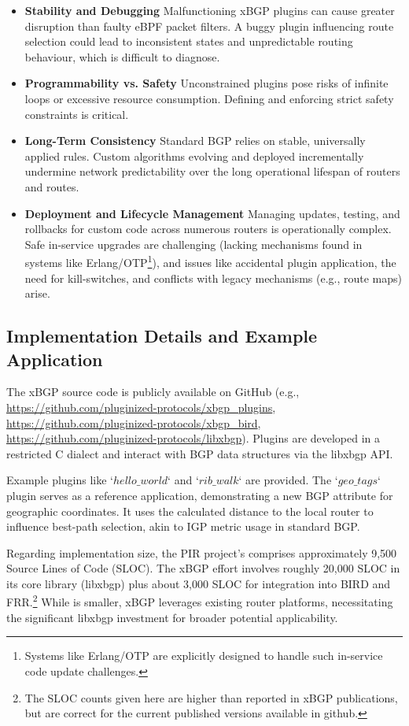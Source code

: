 \begin{itemize}
    \item \textbf{Stability and Debugging} Malfunctioning xBGP plugins can cause greater disruption than faulty eBPF packet filters. A buggy plugin influencing route selection could lead to inconsistent states and unpredictable routing behaviour, which is difficult to diagnose.
    \item \textbf{Programmability vs. Safety} Unconstrained plugins pose risks of infinite loops or excessive resource consumption. Defining and enforcing strict safety constraints is critical.
    \item \textbf{Long-Term Consistency} Standard BGP relies on stable, universally applied rules. Custom algorithms evolving and deployed incrementally undermine network predictability over the long operational lifespan of routers and routes.
    \item \textbf{Deployment and Lifecycle Management} Managing updates, testing, and rollbacks for custom code across numerous routers is operationally complex. Safe in-service upgrades are challenging (lacking mechanisms found in systems like Erlang/OTP\footnote{Systems like Erlang/OTP are explicitly designed to handle such in-service code update challenges.}), and issues like accidental plugin application, the need for kill-switches, and conflicts with legacy mechanisms (e.g., route maps) arise.
\end{itemize}

\subsection{Implementation Details and Example Application}

The xBGP source code is publicly available on GitHub (e.g., \url{https://github.com/pluginized-protocols/xbgp_plugins}, \url{https://github.com/pluginized-protocols/xbgp_bird}, \url{https://github.com/pluginized-protocols/libxbgp}). Plugins are developed in a restricted C dialect and interact with BGP data structures via the libxbgp API.

Example plugins like `$hello\_world$` and `$rib\_walk$` are provided. The `$geo\_tags$` plugin serves as a reference application, demonstrating a new BGP attribute for geographic coordinates. It uses the calculated distance to the local router to influence best-path selection, akin to IGP metric usage in standard BGP.

Regarding implementation size, the PIR project's \hbgp comprises approximately 9,500 Source Lines of Code (SLOC). The xBGP effort involves roughly 20,000 SLOC in its core library (libxbgp) plus about 3,000 SLOC for integration into BIRD and FRR.\footnote{The SLOC counts given here are higher than reported in xBGP publications, but are correct for the current published versions available in github.} While \hbgp is smaller, xBGP leverages existing router platforms, necessitating the significant libxbgp investment for broader potential applicability.

